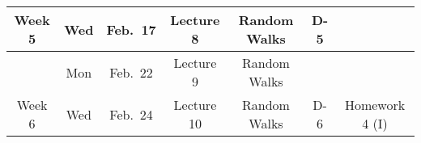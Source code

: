 \documentclass[12pt]{article}
\begin{document}
{\begin{tabular}{ccccccc}
{\bf{Week 5}}  & Wed & Feb.~17  &   Lecture 8  &  Random Walks  & D-5&   \\
  \hline  
           & Mon & Feb.~22 & Lecture 9 &   Random Walks  &     &  \\
  Week 6    & Wed & Feb.~24  & Lecture 10 & Random Walks &   D-6  & Homework 4 (I)\\


\end{tabular}}
\end{document}
